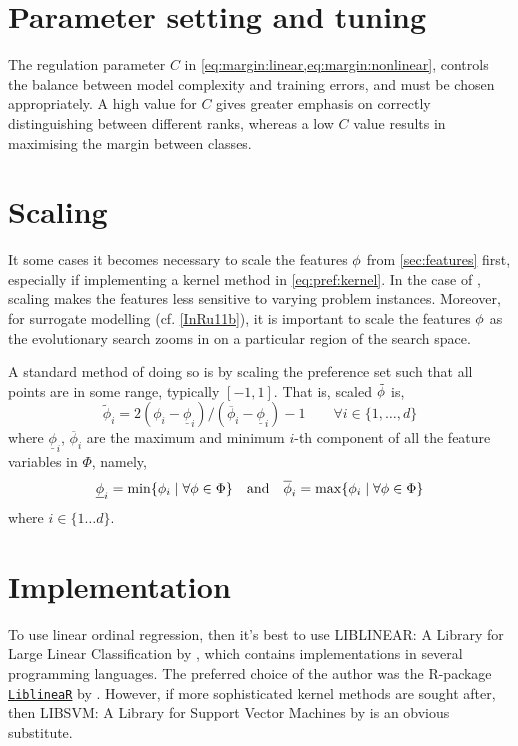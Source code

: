\section{Parameter setting and tuning}
The regulation parameter $C$ in \cref{eq:margin:linear,eq:margin:nonlinear}, 
controls the balance between model complexity and training errors, and must be 
chosen appropriately. A high value for $C$ gives greater emphasis on correctly 
distinguishing between different ranks, whereas a low $C$ value results in 
maximising the margin between classes.

\section{Scaling}\label{app:feat:scaling}
It some cases it becomes necessary to scale the features ${\mathbf{\phi}}$ from 
\cref{sec:features} first, especially if implementing a kernel method in 
\cref{eq:pref:kernel}.
In the case of \JSP, scaling makes the features less sensitive to varying 
problem instances.
Moreover, for surrogate modelling (cf. \cref{InRu11b}), it is important to 
scale the features ${\mathbf{\phi}}$ as the evolutionary search zooms in on a particular 
region of the search space. 

A standard method of doing so is by scaling the preference set such that all 
points are in some range, typically $[-1,1]$. That is, scaled $\tilde{{\mathbf{\phi}}}$ 
is,
\begin{equation}\label{eq:scale}
\tilde{\phi}_i = 2 (\phi_i - \underline{\phi}_i) / (\overline{\phi}_i - 
\underline{\phi}_i) - 1 
\quad\quad \forall i\in\{1,\ldots,d\}
\end{equation}
where $\underline{\phi}_i$, $\overline{\phi}_i$ are the maximum and minimum 
$i$-th component of all the feature variables in $\Phi$, namely,
\begin{equation}
\underline{\phi}_i=\min\{\phi_i\;|\;\forall{\mathbf{\phi}}\in \Phi\} 
\quad\textrm{and}\quad \overline{\phi}_i=\max\{\phi_i\;|\;\forall{\mathbf{\phi}}\in 
\Phi\}
\end{equation}
where $i\in\{1\ldots d\}$. 

\section{Implementation}
To use linear ordinal regression, then it's best to use LIBLINEAR: A 
Library for Large Linear Classification by \citet{main:LIBLINEAR}, which 
contains implementations in several programming languages. The preferred choice 
of the author was the R-package 
\href{https://cran.r-project.org/web/packages/LiblineaR/}{\texttt{LiblineaR}} 
by \citet{cran:LiblineaR}.
However, if more sophisticated kernel methods are sought after, then {LIBSVM}: 
A Library for Support Vector Machines by 
\citet{main:LIBSVM} is an obvious substitute.

